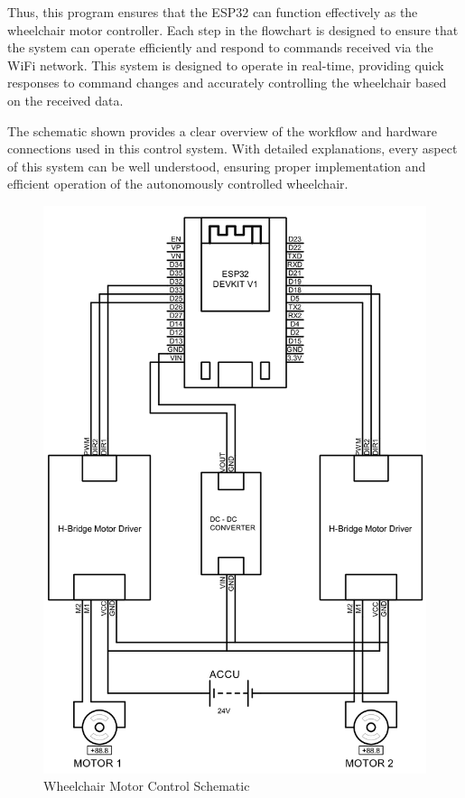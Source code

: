 Thus, this program ensures that the ESP32 can function effectively as the wheelchair motor controller. Each step in the flowchart is designed to ensure that the system can operate efficiently and respond to commands received via the WiFi network. This system is designed to operate in real-time, providing quick responses to command changes and accurately controlling the wheelchair based on the received data.

The schematic shown provides a clear overview of the workflow and hardware connections used in this control system. With detailed explanations, every aspect of this system can be well understood, ensuring proper implementation and efficient operation of the autonomously controlled wheelchair. \cite{ekatama2024perancangan}

\begin{figure}[H]
  \centering

  \includegraphics[scale=0.2]{gambar/Schematics.png}

  \caption{Wheelchair Motor Control Schematic}
  \label{fig:Wheelchair Motor Control Schematic}
\end{figure}

